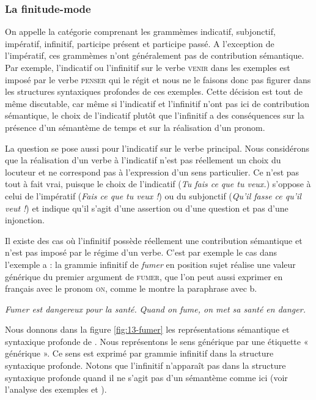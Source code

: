 \subsubsection{La finitude-mode} 
On appelle  la catégorie comprenant les grammèmes indicatif, subjonctif, impératif, infinitif, participe présent et participe passé. A l’exception de l’impératif, ces grammèmes n’ont généralement pas de contribution sémantique. Par exemple, l’indicatif ou l’infinitif sur le verbe \textsc{venir} dans les exemples  est imposé par le verbe \textsc{penser} qui le régit et nous ne le faisons donc pas figurer dans les structures syntaxiques profondes de ces exemples. Cette décision est tout de même discutable, car même si l’indicatif et l’infinitif n’ont pas ici de contribution sémantique, le choix de l’indicatif plutôt que l’infinitif a des conséquences sur la présence d’un sémantème de temps et sur la réalisation d’un pronom.

La question se pose aussi pour l’indicatif sur le verbe principal. Nous considérons que la réalisation d’un verbe à l’indicatif n’est pas réellement un choix du locuteur et ne correspond pas à l’expression d’un sens particulier. Ce n’est pas tout à fait vrai, puisque le choix de l’indicatif (\textit{Tu fais ce que tu veux.}) s’oppose à celui de l’impératif (\textit{Fais ce que tu veux !}) ou du subjonctif (\textit{Qu’il fasse ce qu’il veut !}) et indique qu’il s’agit d’une assertion ou d’une question et pas d’une injonction.

Il existe des cas où l’infinitif possède réellement une contribution sémantique et n’est pas imposé par le régime d’un verbe. C’est par exemple le cas dans l’exemple a : la grammie infinitif de \textit{fumer} en position sujet réalise une valeur générique du premier argument de \textsc{fumer}, que l’on peut aussi exprimer en français avec le pronom \textsc{on}, comme le montre la paraphrase avec b. 

\ea\label{ex:13-fumer}
\ea \textit{Fumer est dangereux pour la santé.}
\ex \textit{Quand on fume, on met sa santé en danger.}\z\z

Nous donnons dans la figure \ref{fig:13-fumer} les représentations sémantique et syntaxique profonde de . Nous représentons le sens générique par une étiquette « générique ». Ce sens est exprimé par grammie infinitif dans la structure syntaxique profonde. Notons que l’infinitif n’apparaît pas dans la structure syntaxique profonde quand il ne s’agit pas d’un sémantème comme ici (voir l’analyse des exemples  et ).

